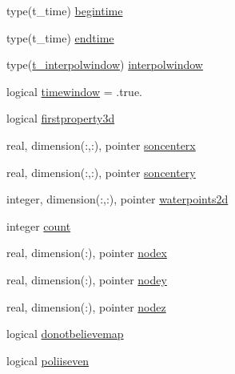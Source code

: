 \begin{DoxyCompactItemize}
\item 
type(t\+\_\+time) \mbox{\hyperlink{structmoduleinterpolategrids_1_1t__interpolategrids_aa69cd26a6613081ae0382a487fd69cd3}{begintime}}
\item 
type(t\+\_\+time) \mbox{\hyperlink{structmoduleinterpolategrids_1_1t__interpolategrids_a0ce1353d705c1eb9a7347af8d4451732}{endtime}}
\item 
type(\mbox{\hyperlink{structmoduleinterpolategrids_1_1t__interpolwindow}{t\+\_\+interpolwindow}}) \mbox{\hyperlink{structmoduleinterpolategrids_1_1t__interpolategrids_a9680ade0eb9064a4154aacca0e9fc24f}{interpolwindow}}
\item 
logical \mbox{\hyperlink{structmoduleinterpolategrids_1_1t__interpolategrids_a4ea459c94e89eb8be90b3910ae278773}{timewindow}} = .true.
\item 
logical \mbox{\hyperlink{structmoduleinterpolategrids_1_1t__interpolategrids_abf8c08cb6d40201cc0b10a2d9d59426b}{firstproperty3d}}
\item 
real, dimension(\+:,\+:), pointer \mbox{\hyperlink{structmoduleinterpolategrids_1_1t__interpolategrids_a607af35ab548ad7c1a769595eb2deb37}{soncenterx}}
\item 
real, dimension(\+:,\+:), pointer \mbox{\hyperlink{structmoduleinterpolategrids_1_1t__interpolategrids_a6e544d55470712650b12ab6ff10e0a2e}{soncentery}}
\item 
integer, dimension(\+:,\+:), pointer \mbox{\hyperlink{structmoduleinterpolategrids_1_1t__interpolategrids_ac3c781c7784d6fcc763eed51c4e83ec2}{waterpoints2d}}
\item 
integer \mbox{\hyperlink{structmoduleinterpolategrids_1_1t__interpolategrids_abeb5ee76b5b11c15d0a1e65884f41b5f}{count}}
\item 
real, dimension(\+:), pointer \mbox{\hyperlink{structmoduleinterpolategrids_1_1t__interpolategrids_afbad2df75ae8034e2ea438a22c9bf802}{nodex}}
\item 
real, dimension(\+:), pointer \mbox{\hyperlink{structmoduleinterpolategrids_1_1t__interpolategrids_a180c23e88a3120ebf29bff54d5009a5c}{nodey}}
\item 
real, dimension(\+:), pointer \mbox{\hyperlink{structmoduleinterpolategrids_1_1t__interpolategrids_a1efa29d57f6c758ca22543b3d78b5da3}{nodez}}
\item 
logical \mbox{\hyperlink{structmoduleinterpolategrids_1_1t__interpolategrids_a17b3bbb6040ca146b39b5abbcca64412}{donotbelievemap}}
\item 
logical \mbox{\hyperlink{structmoduleinterpolategrids_1_1t__interpolategrids_af871d5ae0b41d000808f847e64c724ed}{poliiseven}}

\end{DoxyCompactItemize}
